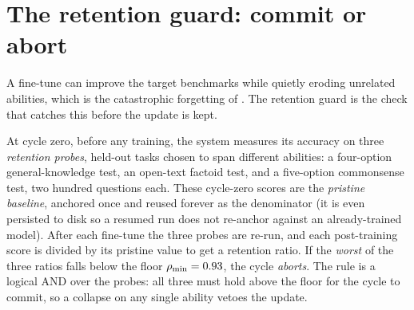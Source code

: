 \section{The retention guard: commit or abort}
\label{sec:cycle-guard}

A fine-tune can improve the target benchmarks while quietly eroding unrelated abilities,
which is the catastrophic forgetting of . The retention guard is the
check that catches this before the update is kept.

\begin{precise}
At cycle zero, before any training, the system measures its accuracy on three
\emph{retention probes}, held-out tasks chosen to span different abilities: a
four-option general-knowledge test, an open-text factoid test, and a five-option
commonsense test, two hundred questions each. These cycle-zero scores are the
\emph{pristine baseline}, anchored once and reused forever as the denominator (it is even
persisted to disk so a resumed run does not re-anchor against an already-trained model).
After each fine-tune the three probes are re-run, and each post-training score is divided
by its pristine value to get a retention ratio. If the \emph{worst} of the three ratios
falls below the floor $\rho_{\min} = 0.93$, the cycle \emph{aborts}. The rule is a logical
AND over the probes: all three must hold above the floor for the cycle to commit, so a
collapse on any single ability vetoes the update.
\end{precise}

